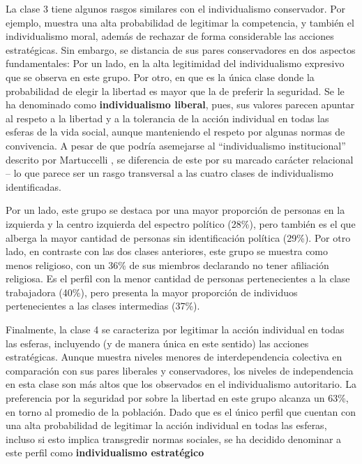\documentclass[12pt,oneside]{templates/facsothesis}
\begin{document}
La clase 3 tiene algunos rasgos similares con el individualismo conservador. Por ejemplo, muestra una alta probabilidad de legitimar la competencia, y también el individualismo moral, además de rechazar de forma considerable las acciones estratégicas. Sin embargo, se distancia de sus pares conservadores en dos aspectos fundamentales: Por un lado, en la alta legitimidad del individualismo expresivo que se observa en este grupo. Por otro, en que es la única clase donde la probabilidad de elegir la libertad es mayor que la de preferir la seguridad. Se le ha denominado como \textbf{individualismo liberal}, pues, sus valores parecen apuntar al respeto a la libertad y a la tolerancia de la acción individual en todas las esferas de la vida social, aunque manteniendo el respeto por algunas normas de convivencia. A pesar de que podría asemejarse al ``individualismo institucional'' descrito por Martuccelli \citeyearpar{martuccelli2010}, se diferencia de este por su marcado carácter relacional -- lo que parece ser un rasgo transversal a las cuatro clases de individualismo identificadas.

Por un lado, este grupo se destaca por una mayor proporción de personas en la izquierda y la centro izquierda del espectro político (28\%), pero también es el que alberga la mayor cantidad de personas sin identificación política (29\%). Por otro lado, en contraste con las dos clases anteriores, este grupo se muestra como menos religioso, con un 36\% de sus miembros declarando no tener afiliación religiosa. Es el perfil con la menor cantidad de personas pertenecientes a la clase trabajadora (40\%), pero presenta la mayor proporción de individuos pertenecientes a las clases intermedias (37\%).

Finalmente, la clase 4 se caracteriza por legitimar la acción individual en todas las esferas, incluyendo (y de manera única en este sentido) las acciones estratégicas. Aunque muestra niveles menores de interdependencia colectiva en comparación con sus pares liberales y conservadores, los niveles de independencia en esta clase son más altos que los observados en el individualismo autoritario. La preferencia por la seguridad por sobre la libertad en este grupo alcanza un 63\%, en torno al promedio de la población. Dado que es el único perfil que cuentan con una alta probabilidad de legitimar la acción individual en todas las esferas, incluso si esto implica transgredir normas sociales, se ha decidido denominar a este perfil como \textbf{individualismo estratégico}
\end{document}
